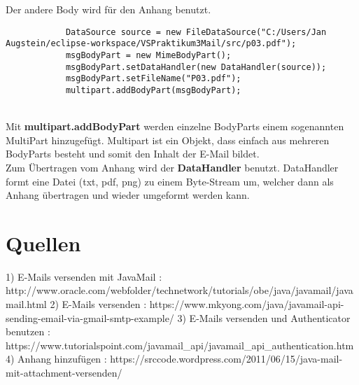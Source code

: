 Der andere Body wird für den Anhang benutzt.
\begin{lstlisting}
			DataSource source = new FileDataSource("C:/Users/Jan Augstein/eclipse-workspace/VSPraktikum3Mail/src/p03.pdf");
			msgBodyPart = new MimeBodyPart();
			msgBodyPart.setDataHandler(new DataHandler(source));
			msgBodyPart.setFileName("P03.pdf");
			multipart.addBodyPart(msgBodyPart);
\end{lstlisting}
\\
Mit \textbf{multipart.addBodyPart} werden einzelne BodyParts einem sogenannten MultiPart hinzugefügt. Multipart ist ein Objekt, dass einfach aus mehreren BodyParts besteht und somit den Inhalt der E-Mail bildet. \\
Zum Übertragen vom Anhang wird der \textbf{DataHandler} benutzt. DataHandler formt eine Datei (txt, pdf, png) zu einem Byte-Stream um, welcher dann als Anhang übertragen und wieder umgeformt werden kann. \\

\section{Quellen}
1) E-Mails versenden mit JavaMail : http://www.oracle.com/webfolder/technetwork/tutorials/obe/java/javamail/javamail.html 
2) E-Mails versenden : https://www.mkyong.com/java/javamail-api-sending-email-via-gmail-smtp-example/
3) E-Mails versenden und Authenticator benutzen : https://www.tutorialspoint.com/javamail_api/javamail_api_authentication.htm 
4) Anhang hinzufügen : https://srccode.wordpress.com/2011/06/15/java-mail-mit-attachment-versenden/ \\






 
